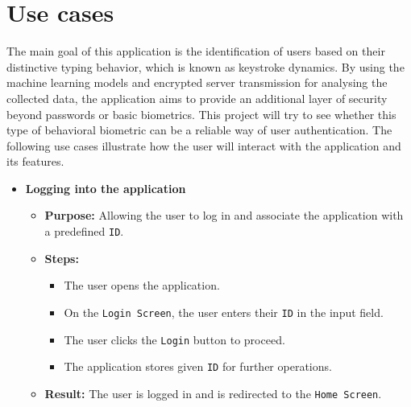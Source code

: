 
\section{Use cases}
The main goal of this application is the identification of users based on their distinctive typing behavior, which is known as keystroke dynamics. By using the machine learning models and encrypted server transmission for analysing the collected data, the application aims to provide an additional layer of security beyond passwords or basic biometrics. This project will try to see whether this type of behavioral biometric can be a reliable way of user authentication. \newline
The following use cases illustrate how the user will interact with the application and its features.

\begin{itemize}
	\item \textbf{Logging into the application}
	\begin{itemize}
		\item \textbf{Purpose:} Allowing the user to log in and associate the application with a predefined \texttt{ID}.
		\item \textbf{Steps:}
		\begin{itemize}
			\item The user opens the application.
			\item On the \texttt{Login Screen}, the user enters their \texttt{ID} in the input field.
			\item The user clicks the \texttt{Login} button to proceed.
			\item The application stores given \texttt{ID} for further operations.
		\end{itemize}
		\item \textbf{Result:} The user is logged in and is redirected to the \texttt{Home Screen}.
	\end{itemize}
	

\end{itemize}
